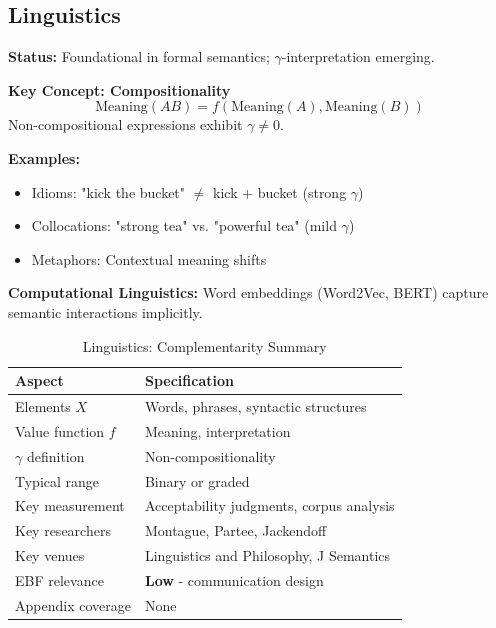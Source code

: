 \subsection{Linguistics}
\label{sec:ling}

\begin{tcolorbox}[colback=violet!5!white,colframe=violet!75!black,title=\textbf{Linguistics: Compositional Semantics}]

\textbf{Status:} Foundational in formal semantics; $\gamma$-interpretation emerging.

\textbf{Key Concept: Compositionality}
\begin{equation}
\text{Meaning}(AB) = f(\text{Meaning}(A), \text{Meaning}(B))
\end{equation}
Non-compositional expressions exhibit $\gamma \neq 0$.

\textbf{Examples:}
\begin{itemize}[noitemsep]
    \item Idioms: "kick the bucket" $\neq$ kick + bucket (strong $\gamma$)
    \item Collocations: "strong tea" vs. "powerful tea" (mild $\gamma$)
    \item Metaphors: Contextual meaning shifts
\end{itemize}

\textbf{Computational Linguistics:}
Word embeddings (Word2Vec, BERT) capture semantic interactions implicitly.

\end{tcolorbox}

\begin{table}[h]
\centering
\caption{Linguistics: Complementarity Summary}
\label{tab:ling-summary}
\renewcommand{\arraystretch}{1.3}
\small
\begin{tabular}{@{}ll@{}}
\toprule
\textbf{Aspect} & \textbf{Specification} \\
\midrule
Elements $X$ & Words, phrases, syntactic structures \\
Value function $f$ & Meaning, interpretation \\
$\gamma$ definition & Non-compositionality \\
Typical range & Binary or graded \\
Key measurement & Acceptability judgments, corpus analysis \\
Key researchers & Montague, Partee, Jackendoff \\
Key venues & Linguistics and Philosophy, J Semantics \\
EBF relevance & \textbf{Low} - communication design \\
Appendix coverage & None \\
\bottomrule
\end{tabular}
\end{table}

